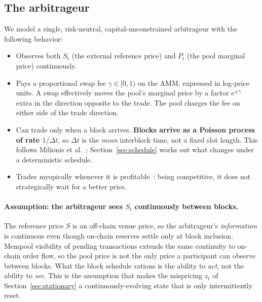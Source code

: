 \documentclass[11pt]{article}
\theoremstyle{definition}
\theoremstyle{remark}
\newcommand{\dt}{\Delta t}
\newcommand{\1}{\mathbf{1}}
\begin{document}
\subsection{The arbitrageur}

We model a single, risk-neutral, capital-unconstrained arbitrageur with the following behavior:
\begin{itemize}[leftmargin=2em]
\item Observes both $S_t$ (the external reference price) and $P_t$ (the pool marginal price) continuously.
\item Pays a proportional swap fee $\gamma \in [0, 1)$ on the AMM, expressed in log-price units. A swap effectively moves the pool's marginal price by a factor $e^{\pm\gamma}$ extra in the direction opposite to the trade. The pool charges the fee on either side of the trade direction.
\item Can trade only when a block arrives. \textbf{Blocks arrive as a Poisson process of rate $1/\dt$}, so $\dt$ is the \emph{mean} interblock time, not a fixed slot length. This follows Milionis et al.~\cite[\S3]{milionis2023automated}; Section~\ref{sec:schedule} works out what changes under a deterministic schedule.
\item Trades myopically whenever it is profitable~\cite[\S3]{milionis2023automated}: being competitive, it does not strategically wait for a better price.
\end{itemize}

\paragraph{Assumption: the arbitrageur sees $S_t$ continuously between blocks.}
The reference price $S$ is an off-chain venue price, so the arbitrageur's \emph{information} is continuous even though on-chain reserves settle only at block inclusion. Mempool visibility of pending transactions extends the same continuity to on-chain order flow, so the pool price is not the only price a participant can observe between blocks. What the block schedule rations is the ability to \emph{act}, not the ability to \emph{see}. This is the assumption that makes the mispricing $z_t$ of Section~\ref{sec:stationary} a continuously-evolving state that is only intermittently reset.
\end{document}
